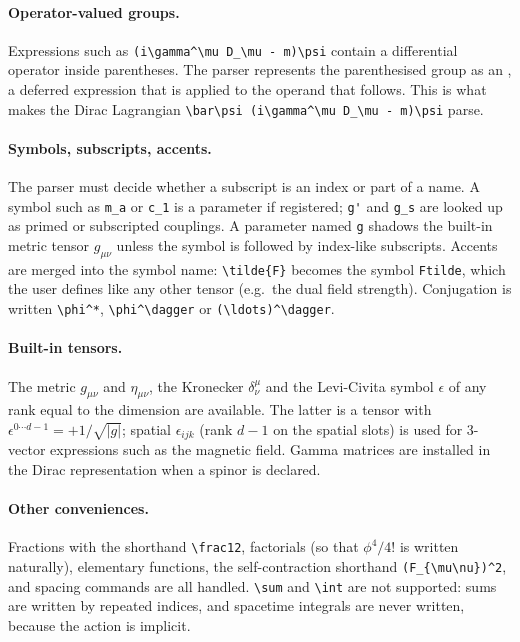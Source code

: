 \paragraph{Operator-valued groups.} Expressions such as \verb|(i\gamma^\mu D_\mu - m)\psi| contain a differential operator inside parentheses. The parser represents the parenthesised group as an , a deferred expression that is applied to the operand that follows. This is what makes the Dirac Lagrangian \verb|\bar\psi (i\gamma^\mu D_\mu - m)\psi| parse.

\paragraph{Symbols, subscripts, accents.} The parser must decide whether a subscript is an index or part of a name. A symbol such as \verb|m_a| or \verb|c_1| is a parameter if registered; \verb|g'| and \verb|g_s| are looked up as primed or subscripted couplings. A parameter named \texttt{g} shadows the built-in metric tensor $g_{\mu\nu}$ unless the symbol is followed by index-like subscripts. Accents are merged into the symbol name: \verb|\tilde{F}| becomes the symbol \texttt{Ftilde}, which the user defines like any other tensor (e.g.\ the dual field strength). Conjugation is written \verb|\phi^*|, \verb|\phi^\dagger| or \verb|(\ldots)^\dagger|.

\paragraph{Built-in tensors.} The metric $g_{\mu\nu}$ and $\eta_{\mu\nu}$, the Kronecker $\delta^\mu_\nu$ and the Levi-Civita symbol $\epsilon$ of any rank equal to the dimension are available. The latter is a tensor with $\epsilon^{0\cdots d-1}=+1/\sqrt{|g|}$; spatial $\epsilon_{ijk}$ (rank $d-1$ on the spatial slots) is used for 3-vector expressions such as the magnetic field. Gamma matrices are installed in the Dirac representation when a spinor is declared.

\paragraph{Other conveniences.} Fractions with the shorthand \verb|\frac12|, factorials (so that $\phi^4/4!$ is written naturally), elementary functions, the self-contraction shorthand \verb|(F_{\mu\nu})^2|, and spacing commands are all handled. \verb|\sum| and \verb|\int| are not supported: sums are written by repeated indices, and spacetime integrals are never written, because the action is implicit.

